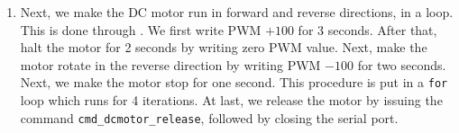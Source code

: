 \begin{enumerate}
  \item Next, we make the DC motor run in forward and reverse
        directions, in a loop.  This is done through
        .  We first write PWM $+100$ for 3
        seconds.  After that, halt the motor for 2 seconds by writing zero PWM value.  
        Next, make the motor rotate in the reverse direction by writing PWM $-100$ for two seconds.  
        Next, we make the motor stop for one second. This procedure is put in a {\tt for} loop which runs for 4 iterations.
        At last, we release the motor by issuing the command {\tt cmd\_dcmotor\_release}, followed by closing the serial port. 
        
\end{enumerate}







